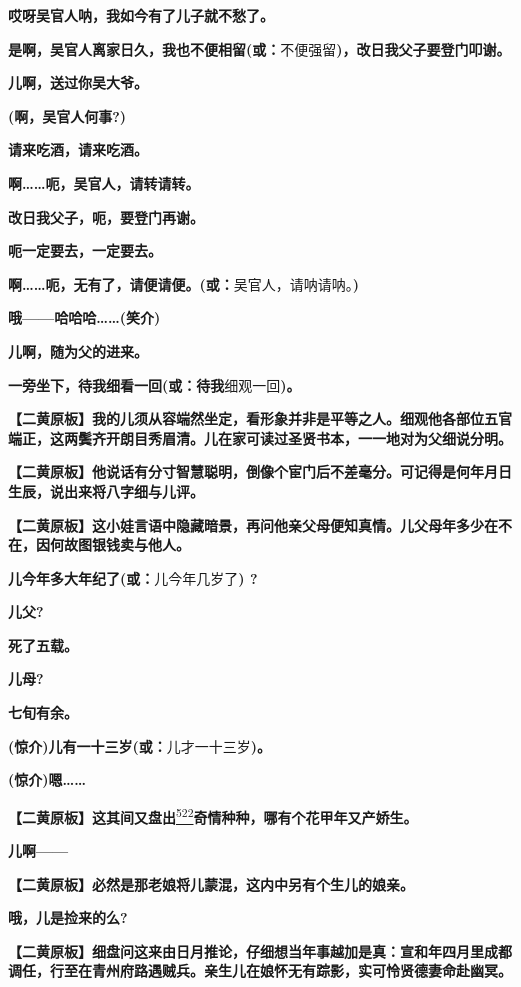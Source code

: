 \textbf{哎呀吴官人呐，我如今有了儿子就不愁了。}

\textbf{是啊，吴官人离家日久，我也不便相留(或：}不便强留\textbf{)，改日我父子要登门叩谢。}

\textbf{儿啊，送过你吴大爷。}

\textbf{(啊，吴官人何事?)}

\textbf{请来吃酒，请来吃酒。}

\textbf{啊\ldots{}\ldots{}呃，吴官人，请转请转。}

\textbf{改日我父子，呃，要登门再谢。}

\textbf{呃一定要去，一定要去。}

\textbf{啊\ldots{}\ldots{}呃，无有了，请便请便。(或：}吴官人，请呐请呐。\textbf{)}

\textbf{哦------哈哈哈\ldots{}\ldots{}(笑介)}

\textbf{儿啊，随为父的进来。}

\textbf{一旁坐下，待我细看一回(或：待我}细观一回\textbf{)。}

\textbf{【二黄原板】我的儿须从容端然坐定，看形象并非是平等之人。细观他各部位五官端正，这两鬓齐开朗目秀眉清。儿在家可读过圣贤书本，一一地对为父细说分明。}

\textbf{【二黄原板】他说话有分寸智慧聪明，倒像个宦门后不差毫分。可记得是何年月日生辰，说出来将八字细与儿评。}

\textbf{【二黄原板】这小娃言语中隐藏暗景，再问他亲父母便知真情。儿父母年多少在不在，因何故图银钱卖与他人。}

\textbf{儿今年多大年纪了(或：}儿今年几岁了\textbf{) ?}

\textbf{儿父?}

\textbf{死了五载。}

\textbf{儿母?}

\textbf{七旬有余。}

\textbf{(惊介)儿有一十三岁(或：}儿才一十三岁\textbf{)。}

\textbf{(惊介)嗯\ldots{}\ldots{}}

\textbf{【二黄原板】这其间又盘出}\protect\hyperlink{fn522}{\textsuperscript{522}}\textbf{奇情种种，哪有个花甲年又产娇生。}

\textbf{儿啊------}

\textbf{【二黄原板】必然是那老娘将儿蒙混，这内中另有个生儿的娘亲。}

\textbf{哦，儿是捡来的么?}

\textbf{【二黄原板】细盘问这来由日月推论，仔细想当年事越加是真：宣和年四月里成都调任，行至在青州府路遇贼兵。亲生儿在娘怀无有踪影，实可怜贤德妻命赴幽冥。}

